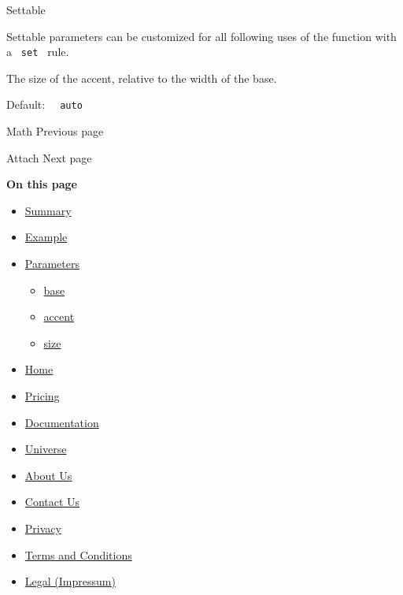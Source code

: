 {{ Settable }}

\label{parameters-size-settable-tooltip}
Settable parameters can be customized for all following uses of the
function with a \texttt{\ set\ } rule.

The size of the accent, relative to the width of the base.

Default: \texttt{\ }{\texttt{\ auto\ }}\texttt{\ }

\href{/docs/reference/math/}{\pandocbounded{}}

{ Math } { Previous page }

\href{/docs/reference/math/attach/}{\pandocbounded{}}

{ Attach } { Next page }

\textbf{On this page}

\begin{itemize}
\tightlist
\item
  \hyperref[summary]{Summary}
\item
  \hyperref[example]{Example}
\item
  \hyperref[parameters]{Parameters}

  \begin{itemize}
  \tightlist
  \item
    \hyperref[parameters-base]{base}
  \item
    \hyperref[parameters-accent]{accent}
  \item
    \hyperref[parameters-size]{size}
  \end{itemize}
\end{itemize}

\begin{itemize}
\tightlist
\item
  \href{/}{Home}
\item
  \href{/pricing/}{Pricing}
\item
  \href{/docs/}{Documentation}
\item
  \href{/universe/}{Universe}
\item
  \href{/about/}{About Us}
\item
  \href{/contact/}{Contact Us}
\item
  \href{/privacy/}{Privacy}
\item
  \href{https://typst.app/terms}{Terms and Conditions}
\item
  \href{/legal/}{Legal (Impressum)}
\end{itemize}

